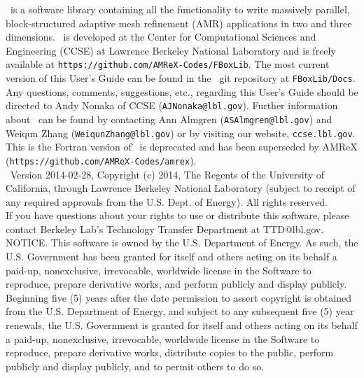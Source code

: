 \noindent \FBoxLib\ is a software library containing all the functionality 
to write massively parallel, 
block-structured adaptive mesh refinement (AMR) applications in two and three dimensions.
\FBoxLib\ is developed at the Center for Computational Sciences and Engineering (CCSE) at 
Lawrence Berkeley National Laboratory and is freely available
at {\tt https://github.com/AMReX-Codes/FBoxLib}.
The most current version of this User's Guide
can be found in the \FBoxLib\ git repository at {\tt FBoxLib/Docs}.  Any questions,
comments, suggestions, etc., regarding this User's Guide should be directed
to Andy Nonaka of CCSE ({\tt AJNonaka@lbl.gov}).  Further information 
about \FBoxLib\ can be found by contacting Ann Almgren
({\tt ASAlmgren@lbl.gov}) and Weiqun Zhang ({\tt WeiqunZhang@lbl.gov})
or by visiting our website, {\tt ccse.lbl.gov}.\\ 

\noindent This is the Fortran version of \BoxLib\.  \FBoxLib\ is deprecated and has
been superseded by AMReX ({\tt https://github.com/AMReX-Codes/amrex}).\\ 

\noindent \BoxLib\ Version 2014-02-28, Copyright (c) 2014, The Regents of the
University of California, through Lawrence Berkeley National
Laboratory (subject to receipt of any required approvals from the U.S.
Dept. of Energy).  All rights reserved.\\ 

\noindent If you have questions about your rights to use or distribute this
software, please contact Berkeley Lab's Technology Transfer Department
at  TTD@lbl.gov.\\ 

\noindent NOTICE.  This software is owned by the U.S. Department of Energy.  As
such, the U.S. Government has been granted for itself and others
acting on its behalf a paid-up, nonexclusive, irrevocable, worldwide
license in the Software to reproduce, prepare derivative works, and
perform publicly and display publicly.  Beginning five (5) years after
the date permission to assert copyright is obtained from the U.S.
Department of Energy, and subject to any subsequent five (5) year
renewals, the U.S. Government is granted for itself and others acting
on its behalf a paid-up, nonexclusive, irrevocable, worldwide license
in the Software to reproduce, prepare derivative works, distribute
copies to the public, perform publicly and display publicly, and to
permit others to do so.
